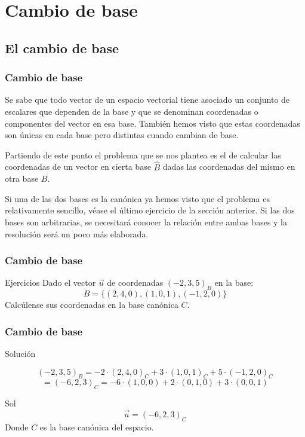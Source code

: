 \documentclass{beamer}
\begin{document}
\section{Cambio de base}
\subsection{El cambio de base}
   \begin{frame}
  \frametitle{Cambio de base}
Se sabe que todo vector de un espacio vectorial tiene asociado un conjunto de escalares que dependen de la base y que se denominan coordenadas o componentes del vector en esa base. Tambi\'en hemos visto que estas coordenadas son \'unicas en cada base pero distintas cuando cambian de base.

Partiendo de este punto el problema que se nos plantea es el de calcular las coordenadas de un vector en cierta base $\hat B$ dadas las coordenadas del mismo en otra base $B$.

Si una de las dos bases es la can\'onica ya hemos visto que el problema es relativamente sencillo, v\'ease el \'ultimo ejercicio de la secci\'on anterior. Si las dos bases son arbitrarias, se necesitar\'a conocer la relaci\'on entre ambas bases y la resoluci\'on ser\'a un poco m\'as elaborada.
\end{frame}




  \begin{frame}
  \frametitle{Cambio de base}
\begin{block}{Ejercicios}
Dado el vector $\vec u$ de coordenadas $(-2,3,5)_B$ en la base: 
\[B=\{(2,4,0),(1,0,1),(-1,2,0)\}\]
Calc\'ulense sus coordenadas en la base can\'onica $C$.
\end{block}
\end{frame}



  \begin{frame}
  \frametitle{Cambio de base}
\begin{block}{Soluci\'on}

\[(-2,3,5)_B=-2\cdot (2,4,0)_C+3\cdot (1,0,1)_C+5\cdot (-1,2,0)_C\]
\[ = (-6,2,3)_C = -6\cdot (1,0,0)+2\cdot (0,1,0)+3\cdot (0,0,1)\]
\end{block}
Sol\[\vec u = \left(-6,2,3\right)_{C} \]
Donde $C$ es la base can\'onica del espacio.
\end{frame}
\end{document}
